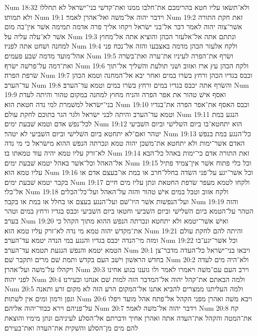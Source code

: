 Num 18:32  ולא־תשׂאו עליו חטא בהרימכם את־חלבו ממנו ואת־קדשׁי בני־ישׂראל לא תחללו ולא תמותו׃
Num 19:1  וידבר יהוה אל־משׁה ואל־אהרן לאמר׃
Num 19:2  זאת חקת התורה אשׁר־צוה יהוה לאמר דבר אל־בני ישׂראל ויקחו אליך פרה אדמה תמימה אשׁר אין־בה מום אשׁר לא־עלה עליה על׃
Num 19:3  ונתתם אתה אל־אלעזר הכהן והוציא אתה אל־מחוץ למחנה ושׁחט אתה לפניו׃
Num 19:4  ולקח אלעזר הכהן מדמה באצבעו והזה אל־נכח פני אהל־מועד מדמה שׁבע פעמים׃
Num 19:5  ושׂרף את־הפרה לעיניו את־ערה ואת־בשׂרה ואת־דמה על־פרשׁה ישׂרף׃
Num 19:6  ולקח הכהן עץ ארז ואזוב ושׁני תולעת והשׁליך אל־תוך שׂרפת הפרה׃
Num 19:7  וכבס בגדיו הכהן ורחץ בשׂרו במים ואחר יבא אל־המחנה וטמא הכהן עד־הערב׃
Num 19:8  והשׂרף אתה יכבס בגדיו במים ורחץ בשׂרו במים וטמא עד־הערב׃
Num 19:9  ואסף אישׁ טהור את אפר הפרה והניח מחוץ למחנה במקום טהור והיתה לעדת בני־ישׂראל למשׁמרת למי נדה חטאת הוא׃
Num 19:10  וכבס האסף את־אפר הפרה את־בגדיו וטמא עד־הערב והיתה לבני ישׂראל ולגר הגר בתוכם לחקת עולם׃
Num 19:11  הנגע במת לכל־נפשׁ אדם וטמא שׁבעת ימים׃
Num 19:12  הוא יתחטא־בו ביום השׁלישׁי וביום השׁביעי יטהר ואם־לא יתחטא ביום השׁלישׁי וביום השׁביעי לא יטהר׃
Num 19:13  כל־הנגע במת בנפשׁ האדם אשׁר־ימות ולא יתחטא את־משׁכן יהוה טמא ונכרתה הנפשׁ ההוא מישׂראל כי מי נדה לא־זרק עליו טמא יהיה עוד טמאתו בו׃
Num 19:14  זאת התורה אדם כי־ימות באהל כל־הבא אל־האהל וכל־אשׁר באהל יטמא שׁבעת ימים׃
Num 19:15  וכל כלי פתוח אשׁר אין־צמיד פתיל עליו טמא הוא׃
Num 19:16  וכל אשׁר־יגע על־פני השׂדה בחלל־חרב או במת או־בעצם אדם או בקבר יטמא שׁבעת ימים׃
Num 19:17  ולקחו לטמא מעפר שׂרפת החטאת ונתן עליו מים חיים אל־כלי׃
Num 19:18  ולקח אזוב וטבל במים אישׁ טהור והזה על־האהל ועל־כל־הכלים ועל־הנפשׁות אשׁר היו־שׁם ועל־הנגע בעצם או בחלל או במת או בקבר׃
Num 19:19  והזה הטהר על־הטמא ביום השׁלישׁי וביום השׁביעי וחטאו ביום השׁביעי וכבס בגדיו ורחץ במים וטהר בערב׃
Num 19:20  ואישׁ אשׁר־יטמא ולא יתחטא ונכרתה הנפשׁ ההוא מתוך הקהל כי את־מקדשׁ יהוה טמא מי נדה לא־זרק עליו טמא הוא׃
Num 19:21  והיתה להם לחקת עולם ומזה מי־הנדה יכבס בגדיו והנגע במי הנדה יטמא עד־הערב׃
Num 19:22  וכל אשׁר־יגע־בו הטמא יטמא והנפשׁ הנגעת תטמא עד־הערב׃
Num 20:1  ויבאו בני־ישׂראל כל־העדה מדבר־צן בחדשׁ הראשׁון וישׁב העם בקדשׁ ותמת שׁם מרים ותקבר שׁם׃
Num 20:2  ולא־היה מים לעדה ויקהלו על־משׁה ועל־אהרן׃
Num 20:3  וירב העם עם־משׁה ויאמרו לאמר ולו גוענו בגוע אחינו לפני יהוה׃
Num 20:4  ולמה הבאתם את־קהל יהוה אל־המדבר הזה למות שׁם אנחנו ובעירנו׃
Num 20:5  ולמה העליתנו ממצרים להביא אתנו אל־המקום הרע הזה לא מקום זרע ותאנה וגפן ורמון ומים אין לשׁתות׃
Num 20:6  ויבא משׁה ואהרן מפני הקהל אל־פתח אהל מועד ויפלו על־פניהם וירא כבוד־יהוה אליהם׃
Num 20:7  וידבר יהוה אל־משׁה לאמר׃
Num 20:8  קח את־המטה והקהל את־העדה אתה ואהרן אחיך ודברתם אל־הסלע לעיניהם ונתן מימיו והוצאת להם מים מן־הסלע והשׁקית את־העדה ואת־בעירם׃
